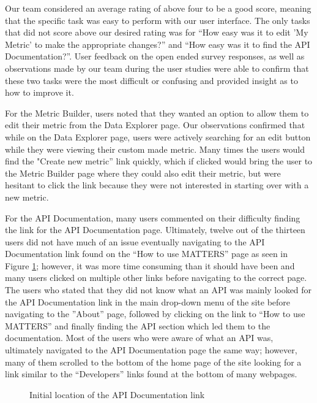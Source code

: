 		Our team considered an average rating of above four to be a good score, 
		meaning that the specific task was easy to perform with our user interface.
		The only tasks that did not score above our desired rating was for 
		“How easy was it to edit 'My Metric' to make the appropriate changes?” 
		and “How easy was it to find the API Documentation?”. User feedback on the 
		open ended survey responses, as well as observations made by our team during 
		the user studies were able to confirm that these two tasks were the most 
		difficult or confusing and provided insight as to how to improve it.
		
		For the Metric Builder, users noted that they wanted an option to 
		allow them to edit their metric from the Data Explorer page. 
		Our observations confirmed that while on the Data Explorer page, 
		users were actively searching for an edit button while they were 
		viewing their custom made metric. Many times the users would find the 
		"Create new metric” link quickly, which if clicked would bring the 
		user to the Metric Builder page where they could also edit their metric, 
		but were hesitant to click the link because they were not 
		interested in starting over with a new metric.
		
		For the API Documentation, many users commented on their difficulty finding 
		the link for the API Documentation page. Ultimately, twelve out of the thirteen 
		users did not have much of an issue eventually navigating to the API Documentation 
		link found on the “How to use MATTERS” page as seen in Figure \ref{fig:how}; however, it was more 
		time consuming than it should have been and many users clicked on multiple other 
		links before navigating to the correct page. The users who stated that they did not 
		know what an API was mainly looked for the API Documentation link in the main drop-down 
		menu of the site before navigating to the ”About” page, followed by clicking on the 
		link to “How to use MATTERS” and finally finding the API section which led them to 
		the documentation. Most of the users who were aware of what an API was, ultimately 
		navigated to the API Documentation page the same way; however, many of them scrolled 
		to the bottom of the home page of the site looking for a link similar to the “Developers” 
		links found at the bottom of many webpages.
		
			\begin{figure}[t]
				\centering
				\caption{Initial location of the API Documentation link}
				\label{fig:how}
			\end{figure}
		
